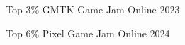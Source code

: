 


\begin{cvhonors}

  \cvhonor
    {Top 3\%} %
    {GMTK Game Jam} %
    {Online} %
    {2023} %

  \cvhonor
    {Top 6\%} %
    {Pixel Game Jam} %
    {Online} %
    {2024} %

\end{cvhonors}


